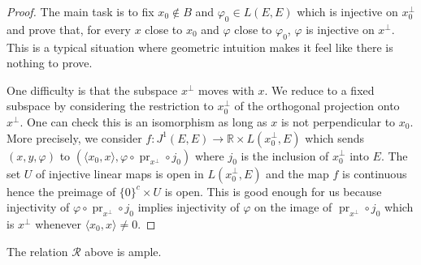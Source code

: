 \documentclass[10pt,a4paper]{article}
\newcommand{\co}{\!:}
\newcommand{\Rel}{\mathcal{R}} %
\DeclareMathOperator{\pr}{pr} %
\newcommand{\uses}[1]{}
\newcommand{\lean}[1]{}
\newcommand{\leanok}{}
\begin{document}
\begin{proof}
  \leanok
  The main task is to fix $x_0 \notin B$
  and $\varphi_0 \in L(E, E)$ which is injective on $x_0^\perp$ and prove that,
  for every $x$ close to $x_0$ and $\varphi$ close to $\varphi_0$, $\varphi$ is
  injective on $x^\perp$. This is a typical situation where geometric intuition
  makes it feel like there is nothing to prove.

  One difficulty is that the subspace $x^\perp$ moves with $x$. We reduce to a fixed
  subspace by considering the restriction to $x_0^\perp$ of the orthogonal
  projection onto $x^\perp$. One can check this is an isomorphism as long as $x$
  is not perpendicular to $x_0$.
  More precisely, we consider $f \co J^1(E, E) \to ℝ \times L(x_0^\perp, E)$ which sends
  $(x, y, \varphi)$ to $(\langle x_0, x\rangle, \varphi \circ \pr_{x^\perp} \circ j_0)$
  where $j_0$ is the inclusion of $x_0^\perp$ into $E$. The set $U$ of injective
  linear maps is open in $L(x_0^\perp, E)$ and the map $f$ is continuous
  hence the preimage of $\{0\}^c \times U$ is open. This is good enough for us because
  injectivity of $\varphi \circ \pr_{x^\perp} \circ j_0$ implies injectivity of
  $\varphi$ on the image of $\pr_{x^\perp} \circ j_0$ which is $x^\perp$ whenever
  $\langle  x_0, x\rangle \neq 0$.
\end{proof}

\begin{lemma}
  \label{lem:loc_immersion_rel_ample}
  \lean{loc_immersion_rel_ample}
  \uses{lem:ample_codim_two}
  \leanok
  The relation $\Rel$ above is ample.
\end{lemma}
\end{document}
